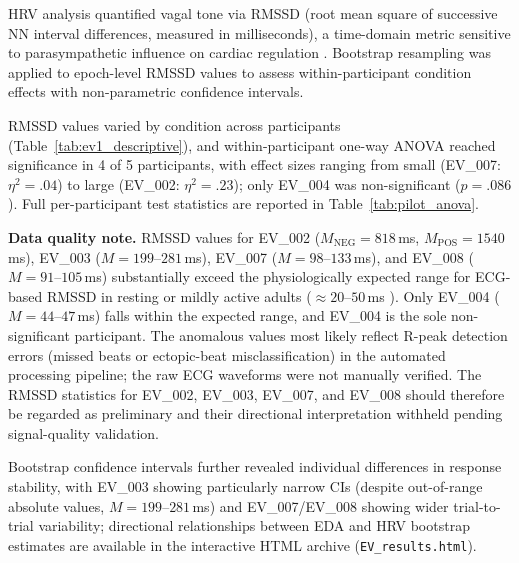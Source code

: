 \gls{HRV} analysis quantified vagal tone via \gls{RMSSD} (root mean square of successive NN interval differences, measured in milliseconds), a time-domain metric sensitive to parasympathetic influence on cardiac regulation \parencite{malikHeartRateVariability1996, shafferOverviewHeartRate2017}. Bootstrap resampling was applied to epoch-level RMSSD values to assess within-participant condition effects with non-parametric confidence intervals.

\gls{RMSSD} values varied by condition across participants (Table~\ref{tab:ev1_descriptive}), and within-participant one-way \gls{ANOVA} reached significance in 4 of 5 participants, with effect sizes ranging from small (EV\_007: $\eta^2 = .04$) to large (EV\_002: $\eta^2 = .23$); only EV\_004 was non-significant ($p = .086$). Full per-participant test statistics are reported in Table~\ref{tab:pilot_anova}.

\noindent\textbf{Data quality note.} \gls{RMSSD} values for EV\_002 ($M_{\text{NEG}} = 818$\,ms, $M_{\text{POS}} = 1540$\,ms), EV\_003 ($M = 199$--$281$\,ms), EV\_007 ($M = 98$--$133$\,ms), and EV\_008 ($M = 91$--$105$\,ms) substantially exceed the physiologically expected range for ECG-based \gls{RMSSD} in resting or mildly active adults ($\approx 20$--$50$\,ms \parencite{malikHeartRateVariability1996, shafferOverviewHeartRate2017}). Only EV\_004 ($M = 44$--$47$\,ms) falls within the expected range, and EV\_004 is the sole non-significant participant. The anomalous values most likely reflect R-peak detection errors (missed beats or ectopic-beat misclassification) in the automated processing pipeline; the raw ECG waveforms were not manually verified. The \gls{RMSSD} statistics for EV\_002, EV\_003, EV\_007, and EV\_008 should therefore be regarded as preliminary and their directional interpretation withheld pending signal-quality validation.

Bootstrap confidence intervals further revealed individual differences in response stability, with EV\_003 showing particularly narrow CIs (despite out-of-range absolute values, $M = 199$--$281$\,ms) and EV\_007/EV\_008 showing wider trial-to-trial variability; directional relationships between \gls{EDA} and \gls{HRV} bootstrap estimates are available in the interactive HTML archive (\texttt{EV\_results.html}).

